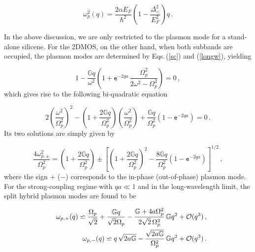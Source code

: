 \documentclass[aps,prb,showpacs]{revtex4}
\newcommand{\mbb}{\mathbb}
\newcommand{\tet}{\texttt}
\begin{document}
\begin{equation}
\omega_p^2(q)= \frac{2\alpha E_F}{\hbar^2}\left( 1 - \frac{\Delta_<^2}{E_F^2}\right) q\, . 
\end{equation}
\medskip

In the above discussion, we are only restricted to the plasmon mode for a stand-alone silicene. For the 2DMOS, on the other hand, when both subbands are occupied, the plasmon modes are determined by Eqs.\,(\ref{sc}) and (\ref{longw}), yielding

\begin{equation}
1 - \frac{\mbb{G}q}{\omega^2}\left(1 + \texttt{e}^{-2qa}\,\frac{\Omega_p^2}{2\omega^2 - \Omega_p^2}\right)  = 0 \, ,
\end{equation}
which gives rise to the following bi-quadratic equation

\begin{equation}
2 \left(\frac{\omega^2}{\Omega^2_p} \right)^2 - \left(1 + \frac{2\mbb{G}q}{\Omega_p^2}\right) \left(\frac{\omega^2}{\Omega^2_p} \right) + 
\frac{\mbb{G} q}{\Omega_p^2} \left( 1 - \tet{e}^{-2qa} \right) = 0 \, .
\end{equation}
Its two solutions are simply given by

\begin{equation}
\frac{4\omega^2_{p,\pm}}{\Omega^2_p}=\left(1 + \frac{2\mbb{G}q}{\Omega_p^2}\right)\pm\left[\left(1 + \frac{2\mbb{G}q}{\Omega_p^2}\right)^2-\frac{8\mbb{G} q}{\Omega_p^2} \left( 1 - \tet{e}^{-2qa} \right)\right]^{1/2}\, ,
\end{equation}
where the sign $+$ ($-$) corresponds to the in-phase (out-of-phase) plasmon mode.
For the strong-coupling regime with $qa\ll 1$ and in the long-wavelength limit, the split hybrid plasmon modes are found to be

\begin{eqnarray}
\nonumber
&& \omega_{p,+}(q) \backsimeq \frac{\Omega_p}{\sqrt{2}} + \frac{\mbb{G}q}{\sqrt{2}\Omega_p}- \frac{\mbb{G}+4a\Omega_p^2}{2\sqrt{2}\,\Omega_p^3}\,\mbb{G}q^2 +{\cal O}(q^3) \, ,
\\
&& \omega_{p,-}(q) \backsimeq q\,\sqrt{2a\mbb{G}}-\frac{ \sqrt{2a\mbb{G}}}{\Omega_p^2}\, \mbb{G}q^2+{\cal O}(q^3)\, .
\label{sl}
\end{eqnarray}
\medskip
\end{document}
